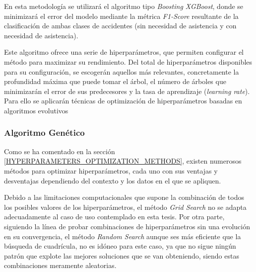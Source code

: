 En esta metodología se utilizará el algoritmo tipo \textit{Boosting XGBoost}, donde se minimizará el error del modelo mediante la métrica \textit{F1-Score} resultante de la clasificación de ambas clases de accidentes (sin necesidad de asistencia y con necesidad de asistencia).

Este algoritmo ofrece una serie de hiperparámetros, que permiten configurar el método para maximizar su rendimiento. Del total de hiperparámetros disponibles para su configuración, se escogerán aquellos más relevantes, concretamente la profundidad máxima que puede tomar el árbol, el número de árboles que minimizarán el error de sus predecesores y  la tasa de aprendizaje (\textit{learning rate}). Para ello se aplicarán técnicas de optimización de hiperparámetros basadas en algoritmos evolutivos




\subsubsection{Algoritmo Genético}

Como se ha comentado en la sección \ref{HYPERPARAMETERS_OPTIMIZATION_METHODS}, existen numerosos métodos para optimizar hiperparámetros, cada uno con sus ventajas y desventajas dependiendo del contexto y los datos en el que se apliquen.

Debido a las limitaciones computacionales que supone la combinación de todos los posibles valores de los hiperparámetros, el método \textit{Grid Search} no se adapta adecuadamente al caso de uso contemplado en esta tesis. Por otra parte, siguiendo la línea de probar combinaciones de hiperparámetros sin una evolución en su convergencia, el método \textit{Random Search} aunque ses más eficiente que la búsqueda de cuadrícula, no es idóneo para este caso, ya que no sigue ningún patrón que explote las mejores soluciones que se van obteniendo, siendo estas combinaciones meramente aleatorias.

